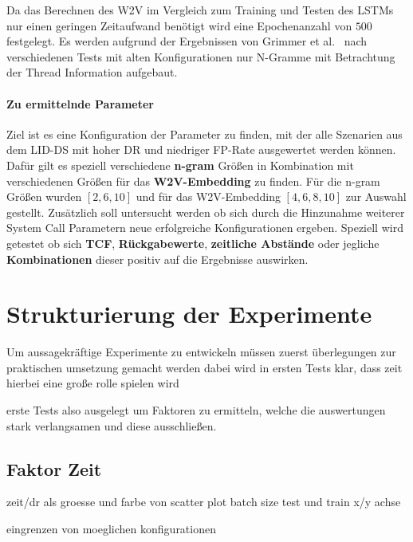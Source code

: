                 Da das Berechnen des \ac{W2V} im Vergleich zum Training und Testen des \acp{LSTM} nur einen geringen Zeitaufwand benötigt wird eine Epochenanzahl von $500$ festgelegt. 
                Es werden aufgrund der Ergebnissen von Grimmer et al.~\cite{IDSTHREADGRIMMER2021} nach verschiedenen Tests mit alten Konfigurationen nur N-Gramme mit Betrachtung der Thread Information aufgebaut.

            \paragraph{Zu ermittelnde Parameter}
            Ziel ist es eine Konfiguration der Parameter zu finden, mit der alle Szenarien aus dem \ac{LID-DS} mit hoher \ac{DR} und niedriger \ac{FP}-Rate ausgewertet werden können.
            Dafür gilt es speziell verschiedene \textbf{n-gram} Größen in Kombination mit verschiedenen Größen für das \textbf{\ac{W2V}-Embedding} zu finden.
            Für die n-gram Größen wurden $[2,6,10]$ und für das \ac{W2V}-Embedding $[4,6,8,10]$ zur Auswahl gestellt.
            Zusätzlich soll untersucht werden ob sich durch die Hinzunahme weiterer System Call Parametern neue erfolgreiche Konfigurationen ergeben.
            Speziell wird getestet ob sich \textbf{\ac{TCF}}, \textbf{Rückgabewerte}, \textbf{zeitliche Abstände} oder jegliche \textbf{Kombinationen} dieser positiv auf die Ergebnisse auswirken.
                
\iffalse
    \section{Strukturierung der Experimente}\label{sec:StrukExp}
        Um aussagekräftige Experimente zu entwickeln müssen zuerst 
        überlegungen zur praktischen umsetzung gemacht werden
        dabei wird in ersten Tests klar, dass zeit hierbei eine große rolle spielen wird

        erste Tests also ausgelegt um Faktoren zu ermitteln, welche die auswertungen stark verlangsamen
        und diese ausschließen.

        \subsection{Faktor Zeit}
            zeit/dr als groesse und farbe von scatter plot
            batch size test und train x/y achse

            eingrenzen von moeglichen konfigurationen

